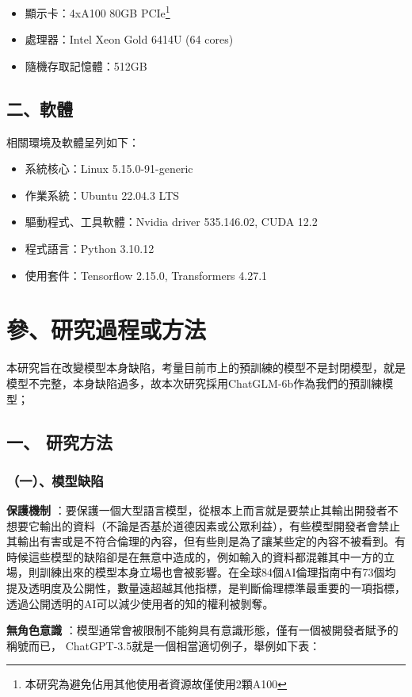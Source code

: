 \documentclass[12pt,a4paper,MingLiU,UTF8,natbib]{article}
\def\xeCJKembold{0.4}
\def\saveCJKnode{\dimen255\lastkern}
\def\restoreCJKnode{\kern-\dimen255\kern\dimen255}
\let\CJKoldsymbol\CJKsymbol
\let\CJKoldpunctsymbol\CJKpunctsymbol
\def\CJKfakeboldsymbol#1{%
	\special{pdf:literal direct 2 Tr \xeCJKembold\space w}%
	\CJKoldsymbol{#1}%
	\saveCJKnode
	\special{pdf:literal direct 0 Tr}%
	\restoreCJKnode}
\def\CJKfakeboldpunctsymbol#1{%
	\special{pdf:literal direct 2 Tr \xeCJKembold\space w}%
	\CJKoldpunctsymbol{#1}%
	\saveCJKnode
	\special{pdf:literal direct 0 Tr}%
	\restoreCJKnode}
\newcommand\CJKfakebold[1]{%
	\let\CJKsymbol\CJKfakeboldsymbol
	\let\CJKpunctsymbol\CJKfakeboldpunctsymbol
	#1%
	\let\CJKsymbol\CJKoldsymbol
	\let\CJKpunctsymbol\CJKoldpunctsymbol}
\begin{document}
	\begin{itemize}
		\item 顯示卡：4xA100 80GB PCIe\footnote{本研究為避免佔用其他使用者資源故僅使用2顆A100}
		\item 處理器：Intel Xeon Gold 6414U (64 cores)
		\item 隨機存取記憶體：512GB
	\end{itemize}


	\subsection{二、軟體}
	相關環境及軟體呈列如下：
	\begin{itemize}
		\item 系統核心：Linux 5.15.0-91-generic
		\item 作業系統：Ubuntu 22.04.3 LTS
		\item 驅動程式、工具軟體：Nvidia driver 535.146.02, CUDA 12.2
		\item 程式語言：Python 3.10.12
		\item 使用套件：Tensorflow 2.15.0, Transformers 4.27.1
	\end{itemize}
	\section{參、研究過程或方法}
	本研究旨在改變模型本身缺陷，考量目前市上的預訓練的模型不是封閉模型，就是模型不完整，本身缺陷過多，故本次研究採用ChatGLM-6b作為我們的預訓練模型；
	\subsection{一、 研究方法}
	\subsubsection{（一）、模型缺陷}
	\CJKfakebold{\textbf{保護機制}}：要保護一個大型語言模型，從根本上而言就是要禁止其輸出開發者不想要它輸出的資料（不論是否基於道德因素或公眾利益），有些模型開發者會禁止其輸出有害或是不符合倫理的內容，但有些則是為了讓某些定的內容不被看到。有時候這些模型的缺陷卻是在無意中造成的，例如輸入的資料都混雜其中一方的立場，則訓練出來的模型本身立場也會被影響。在全球84個AI倫理指南中有73個均提及透明度及公開性，數量遠超越其他指標，是判斷倫理標準最重要的一項指標，透過公開透明的AI可以減少使用者的知的權利被剝奪。\cite{Jobin2019}

	\CJKfakebold{\textbf{無角色意識}}：模型通常會被限制不能夠具有意識形態，僅有一個被開發者賦予的稱號而已，	ChatGPT-3.5就是一個相當適切例子，舉例如下表：
\end{document}
